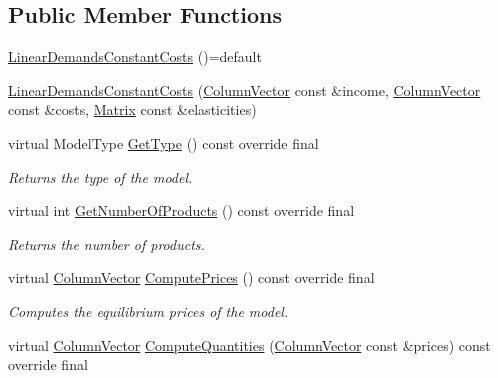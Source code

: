 \subsection*{Public Member Functions}
\begin{DoxyCompactItemize}
\item 
\hyperlink{classLinearDemandsConstantCosts_a79e3cc71f551a3ad3ecfd5ea3818a6c0}{Linear\+Demands\+Constant\+Costs} ()=default
\item 
\hyperlink{classLinearDemandsConstantCosts_a0a7e9c271148594fdc0e4024cfd521a9}{Linear\+Demands\+Constant\+Costs} (\hyperlink{classColumnVector}{Column\+Vector} const \&income, \hyperlink{classColumnVector}{Column\+Vector} const \&costs, \hyperlink{classMatrix}{Matrix} const \&elasticities)
\item 
\mbox{\label{classLinearDemandsConstantCosts_a583af2ebff9e7d09ab02270c97ed57ba}} 
virtual Model\+Type \hyperlink{classLinearDemandsConstantCosts_a583af2ebff9e7d09ab02270c97ed57ba}{Get\+Type} () const override final
\begin{DoxyCompactList}\small\item\em Returns the type of the model. \end{DoxyCompactList}\item 
\mbox{\label{classLinearDemandsConstantCosts_ad968f45ba4a6e9d36b96c1ab92980eb5}} 
virtual int \hyperlink{classLinearDemandsConstantCosts_ad968f45ba4a6e9d36b96c1ab92980eb5}{Get\+Number\+Of\+Products} () const override final
\begin{DoxyCompactList}\small\item\em Returns the number of products. \end{DoxyCompactList}\item 
\mbox{\label{classLinearDemandsConstantCosts_ae2f4565860b89a5576b54884a4d520d1}} 
virtual \hyperlink{classColumnVector}{Column\+Vector} \hyperlink{classLinearDemandsConstantCosts_ae2f4565860b89a5576b54884a4d520d1}{Compute\+Prices} () const override final
\begin{DoxyCompactList}\small\item\em Computes the equilibrium prices of the model. \end{DoxyCompactList}\item 
virtual \hyperlink{classColumnVector}{Column\+Vector} \hyperlink{classLinearDemandsConstantCosts_a310864e458935098502561540a71a88c}{Compute\+Quantities} (\hyperlink{classColumnVector}{Column\+Vector} const \&prices) const override final

\end{DoxyCompactItemize}
